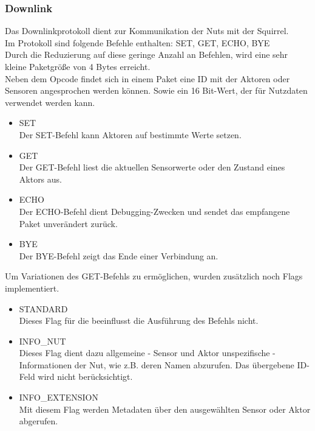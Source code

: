 \documentclass[12pt,a4paper]{article}
\begin{document}
	\subsubsection{Downlink}  
Das Downlinkprotokoll dient zur Kommunikation der Nuts mit der Squirrel.\\
Im Protokoll sind folgende Befehle enthalten: SET, GET, ECHO, BYE\\
Durch die Reduzierung auf diese geringe Anzahl an Befehlen, wird eine sehr kleine Paketgröße von 4 Bytes erreicht.\\
Neben dem Opcode findet sich in einem Paket eine ID mit der Aktoren oder Sensoren angesprochen werden können. Sowie ein 16 Bit-Wert, der für Nutzdaten verwendet werden kann.\\
\begin{itemize}
	\item{SET}\\
Der SET-Befehl kann Aktoren auf bestimmte Werte setzen.
	\item{GET}\\
Der GET-Befehl liest die aktuellen Sensorwerte oder den Zustand eines Aktors aus.
	\item{ECHO}\\
Der ECHO-Befehl dient Debugging-Zwecken und sendet das empfangene Paket unverändert zurück.
	\item{BYE}\\
Der BYE-Befehl zeigt das Ende einer Verbindung an.
\end{itemize}
Um Variationen des GET-Befehls zu ermöglichen, wurden zusätzlich noch Flags implementiert.\\
\begin{itemize}
	\item{STANDARD}\\
Dieses Flag für die beeinflusst die Ausführung des Befehls nicht.
	\item{INFO\_NUT}\\
Dieses Flag dient dazu allgemeine - Sensor und Aktor unspezifische - Informationen der Nut, wie z.B. deren Namen abzurufen. Das übergebene ID-Feld wird nicht berücksichtigt.\\
	\item{INFO\_EXTENSION}\\
Mit diesem Flag werden Metadaten über den ausgewählten Sensor oder Aktor abgerufen.
\end{itemize}
\end{document}
